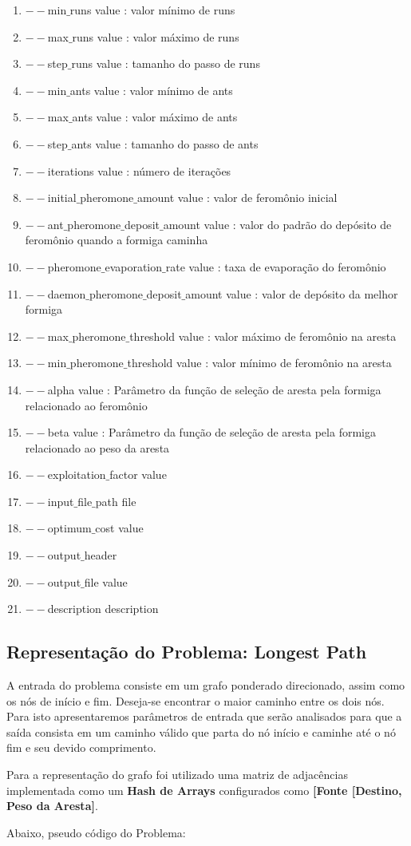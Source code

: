 \documentclass{article}
\begin{document}
\begin{enumerate}
  \item $--$min$\_$runs value : valor mínimo de runs
  \item $--$max$\_$runs value : valor máximo de runs
  \item $--$step$\_$runs value : tamanho do passo de runs
  \item $--$min$\_$ants value : valor mínimo de ants
  \item $--$max$\_$ants value : valor máximo de ants
  \item $--$step$\_$ants value : tamanho do passo de ants
  \item $--$iterations value : número de iterações
  \item $--$initial$\_$pheromone$\_$amount value : valor de feromônio inicial 
  \item $--$ant$\_$pheromone$\_$deposit$\_$amount value : valor do padrão do depósito de feromônio quando a formiga caminha 
  \item $--$pheromone$\_$evaporation$\_$rate value : taxa de evaporação do feromônio
  \item $--$daemon$\_$pheromone$\_$deposit$\_$amount value : valor de depósito da melhor formiga
  \item $--$max$\_$pheromone$\_$threshold value : valor máximo de feromônio na aresta
  \item $--$min$\_$pheromone$\_$threshold value : valor mínimo de feromônio na aresta
  \item $--$alpha value : Parâmetro da função de seleção de aresta pela formiga relacionado ao feromônio
  \item $--$beta value : Parâmetro da função de seleção de aresta pela formiga relacionado ao peso da aresta
  \item $--$exploitation$\_$factor value
  \item $--$input$\_$file$\_$path file
  \item $--$optimum$\_$cost value
  \item $--$output$\_$header
  \item $--$output$\_$file value
  \item $--$description description
\end{enumerate}


\subsection{Representação do Problema: Longest Path}
\par
A entrada do problema consiste em um grafo ponderado direcionado, assim como os nós de início e fim. Deseja-se encontrar o maior caminho entre os dois nós. Para isto apresentaremos parâmetros de entrada que serão analisados para que a saída consista em um caminho válido que parta do nó início e caminhe até o nó fim e seu devido comprimento.
\newline
\par
Para a representação do grafo foi utilizado uma matriz de adjacências implementada como um \textbf{Hash de Arrays} configurados como \textbf{[Fonte [Destino, Peso da Aresta]}. 
\newline
\par
Abaixo, pseudo código do Problema:
\end{document}

